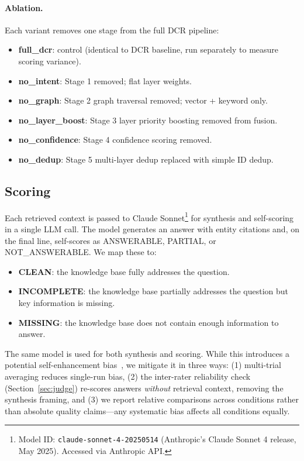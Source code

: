 \documentclass[11pt,a4paper]{article}
\begin{document}
\paragraph{Ablation.} Each variant removes one stage from the full DCR pipeline:
\begin{itemize}[nosep]
  \item \textbf{full\_dcr}: control (identical to DCR baseline, run separately to measure scoring variance).
  \item \textbf{no\_intent}: Stage 1 removed; flat layer weights.
  \item \textbf{no\_graph}: Stage 2 graph traversal removed; vector + keyword only.
  \item \textbf{no\_layer\_boost}: Stage 3 layer priority boosting removed from fusion.
  \item \textbf{no\_confidence}: Stage 4 confidence scoring removed.
  \item \textbf{no\_dedup}: Stage 5 multi-layer dedup replaced with simple ID dedup.
\end{itemize}

\subsection{Scoring}

Each retrieved context is passed to Claude Sonnet\footnote{Model ID: \texttt{claude-sonnet-4-20250514} (Anthropic's Claude Sonnet 4 release, May 2025). Accessed via Anthropic API.} for synthesis and self-scoring in a single LLM call. The model generates an answer with entity citations and, on the final line, self-scores as ANSWERABLE, PARTIAL, or NOT\_ANSWERABLE. We map these to:

\begin{itemize}[nosep]
  \item \textbf{CLEAN}: the knowledge base fully addresses the question.
  \item \textbf{INCOMPLETE}: the knowledge base partially addresses the question but key information is missing.
  \item \textbf{MISSING}: the knowledge base does not contain enough information to answer.
\end{itemize}

The same model is used for both synthesis and scoring. While this introduces a potential self-enhancement bias~\citep{zheng2023judging}, we mitigate it in three ways: (1) multi-trial averaging reduces single-run bias, (2) the inter-rater reliability check (Section~\ref{sec:judge}) re-scores answers \emph{without} retrieval context, removing the synthesis framing, and (3) we report relative comparisons across conditions rather than absolute quality claims---any systematic bias affects all conditions equally.
\end{document}
